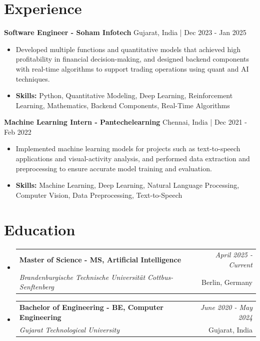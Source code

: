 \documentclass[a4paper,11pt]{article}
\makeatletter
\newcommand{\resumeSubheading}[4]{
\vspace{0.5mm}\item
    \begin{tabular*}{\linewidth}[t]{l@{\extracolsep{\fill}}r}
        \textbf{#1} & \textit{\footnotesize{#4}} \\
        \textit{\footnotesize{#3}} &  \footnotesize{#2}\\
    \end{tabular*}
    \vspace{-2.4mm}
}
\makeatother
\begin{document}
\section{\textbf{Experience}}


\vspace{1mm}
  \textbf{Software Engineer - Soham Infotech} \hfill Gujarat, India | Dec 2023 - Jan 2025
\vspace{-1.5mm} %
\begin{itemize}
  \item Developed multiple functions and quantitative models that achieved high profitability in financial decision-making, and designed backend components with real-time algorithms to support trading operations using quant and AI techniques.

\vspace{-2mm}
  \item \textbf{Skills:} Python, Quantitative Modeling, Deep Learning, Reinforcement Learning, Mathematics, Backend Components, Real-Time Algorithms
\end{itemize}

\vspace{1mm}
  \textbf{Machine Learning Intern - Pantechelearning} \hfill Chennai, India | Dec 2021 - Feb 2022
\vspace{-1.5mm} %
\begin{itemize}
  \item Implemented machine learning models for projects such as text-to-speech applications and visual-activity analysis, and performed data extraction and preprocessing to ensure accurate model training and evaluation.
\vspace{-2mm}
  \item \textbf{Skills:} Machine Learning, Deep Learning, Natural Language Processing, Computer Vision, Data Preprocessing, Text-to-Speech
\end{itemize}\section{\textbf{Education}}
\vspace{-0.4mm}

\begin{itemize}[leftmargin=0.15in, label={}]
\resumeSubheading
{Master of Science - MS, Artificial Intelligence }{Berlin, Germany}
{Brandenburgische Technische Universität Cottbus-Senftenberg  }{April 2025 - Current}

\vspace{1.0mm} %
\resumeSubheading
{Bachelor of Engineering - BE, Computer Engineering  }{Gujarat, India}
{Gujarat Technological University }{June 2020 - May 2024}

\end{itemize}
\end{document}
